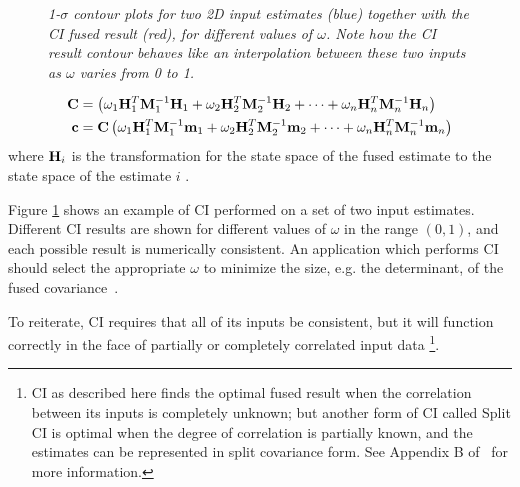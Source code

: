 \begin{figure}[tbp]
    \caption{\it 1-$\sigma$ contour plots for two 2D input estimates (blue) together with the CI fused result (red), for
        different values of $\omega$. Note how the CI result contour behaves like an interpolation between these two
        inputs as $\omega$ varies from 0 to 1. }
    \label{fig:ci2d}
\end{figure}
\begin{align}
    \mathbf{C} &= \left(\omega_1\mathbf{H}_1^T\mathbf{M}^{-1}_1\mathbf{H}_1+\omega_2\mathbf{H}_2^T\mathbf{M}^{-1}_2\mathbf{H}_2+\dots+\omega_n\mathbf{H}_n^T\mathbf{M}^{-1}_n\mathbf{H}_n\right)\label{eqn:cicov}\\
    \mathbf{c} &= \mathbf{C}\left(\omega_1\mathbf{H}_1^T\mathbf{M}^{-1}_1\mathbf{m}_1+\omega_2\mathbf{H}_2^T\mathbf{M}^{-1}_2\mathbf{m}_2+\dots+\omega_n\mathbf{H}_n^T\mathbf{M}^{-1}_n\mathbf{m}_n\right)\label{eqn:cimean}
\end{align}
where $\mathbf{H}_i$ is the transformation for the state space of the fused estimate to the state space of the estimate $i$
\cite{uhlmann03,fusion01}.

Figure \ref{fig:ci2d} shows an example of CI performed on a set of two input estimates. Different CI results are shown
for different values of $\omega$ in the range $(0,1)$, and each possible result is numerically consistent. An application which
performs CI should select the appropriate $\omega$ to minimize the size, e.g. the determinant, of the fused
covariance~\cite{uhlmann03}.

To reiterate, CI requires that all of its inputs be consistent, but it will function correctly in the face of partially
or completely correlated input data \footnote{CI as described here finds the optimal fused result when the correlation
between its inputs is completely unknown; but another form of CI called Split CI is optimal when the degree of
correlation is partially known, and the estimates can be represented in split covariance form. See Appendix B
of~\cite{uhlmann03} for more information.}.



